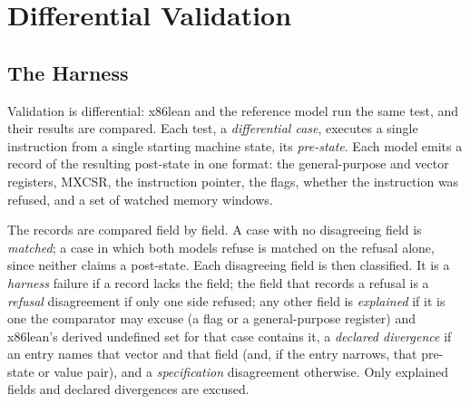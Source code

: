 \documentclass[runningheads]{llncs}
\newcommand{\src}[1]{}  %
\begin{document}
\section{Differential Validation}
\label{sec:validation}

\subsection{The Harness}
\label{sec:validation:harness}

Validation is differential: x86lean and the reference model run the same test, and their results
are compared. Each test, a \emph{differential case}, executes a single instruction from a single
starting machine state, its \emph{pre-state}. Each model emits a record of the resulting post-state
in one format: the general-purpose and vector registers, MXCSR, the
instruction pointer, the flags, whether the instruction was refused, and a set of watched memory
windows.
\src{X86/Serialize.lean Cpu.render; scripts/run\_differential.sh}
The records are compared field by field. A case with no disagreeing field is \emph{matched}; a case in
which both models refuse is matched on the refusal alone, since neither claims a post-state. Each disagreeing field is then classified. It is a \emph{harness} failure if a record lacks the field; the field that records a refusal is a \emph{refusal} disagreement if only one side refused; any other field is \emph{explained} if it is one the comparator may excuse (a flag or a general-purpose register) and x86lean's derived undefined set for that case contains it, a \emph{declared divergence} if an entry names that vector and that field (and, if the entry narrows, that pre-state or value pair), and a \emph{specification} disagreement otherwise. Only explained fields and declared divergences are excused.
\src{Main.lean classify, bothRefused, undefinableFields, knownDivergences; KnownDivergence's states and pair fields (D331, D266)}
\end{document}
